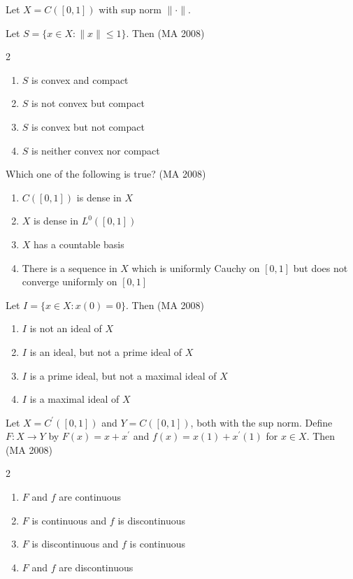 \item
Let $X = C([0,1])$ with sup norm $\|\cdot\|$.

Let $S = \{x \in X : \|x\| \leq 1\}$. Then
\hfill (MA 2008)
\begin{multicols}{2}
\begin{enumerate}
    \item $S$ is convex and compact
    \item $S$ is not convex but compact
    \item $S$ is convex but not compact
    \item $S$ is neither convex nor compact
\end{enumerate}
\end{multicols}

\item
Which one of the following is true?
\hfill (MA 2008)

\begin{enumerate}
    \item $C([0,1])$ is dense in $X$
    \item $X$ is dense in $L^0([0,1])$
    \item $X$ has a countable basis
    \item There is a sequence in $X$ which is uniformly Cauchy on $[0,1]$ but does not converge uniformly on $[0,1]$
\end{enumerate}


\item
Let $I = \{x \in X : x(0) = 0\}$. Then
\hfill (MA 2008)

\begin{enumerate}
    \item $I$ is not an ideal of $X$
    \item $I$ is an ideal, but not a prime ideal of $X$
    \item $I$ is a prime ideal, but not a maximal ideal of $X$
    \item $I$ is a maximal ideal of $X$
\end{enumerate}


\item
Let $X = C^{\prime}([0,1])$ and $Y = C([0,1])$, both with the sup norm. Define $F: X \to Y$ by $F(x) = x + x^{\prime}$ and $f(x) = x(1) + x^{\prime}(1)$ for $x \in X$. Then
\hfill (MA 2008)
\begin{multicols}{2}
\begin{enumerate}
    \item $F$ and $f$ are continuous
    \item $F$ is continuous and $f$ is discontinuous
    \item $F$ is discontinuous and $f$ is continuous
    \item $F$ and $f$ are discontinuous
\end{enumerate}
\end{multicols}

